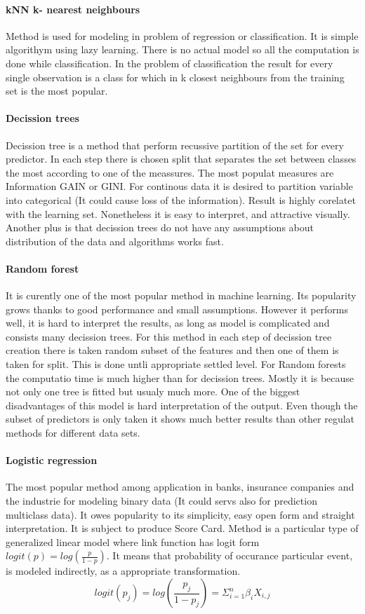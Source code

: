 \documentclass[10pt]{article}\usepackage[]{graphicx}\usepackage[]{color}
\begin{document}
\paragraph{kNN k- nearest neighbours}
Method is used for modeling in problem of regression or classification. 
It is simple algorithym using lazy learning. There is no actual model so all the 
computation is done while classification. 
In the problem of classification the result for every single observation is 
a class for which in k closest neighbours from the training set is the most
popular.
\paragraph{Decission trees}
Decission tree is a method that perform recussive partition of the set for every
predictor. In each step there is chosen split that separates the set between 
classes the most according to one of the meassures. The most populat measures 
are Information GAIN or GINI.
For continous data it is desired to partition variable into categorical 
(It could cause loss of the information). Result is highly corelatet with the 
learning set. Nonetheless it is easy to interpret, and attractive visually. 
Another plus is that decission trees do not have any assumptions about 
distribution of the data and algorithms works fast. 
\paragraph{Random forest}
It is curently one of the most popular method in machine learning. Its popularity 
grows thanks to good performance and small assumptions. 
However it performs well, it is hard to interpret the results, as long as model 
is complicated and consists many decission trees. 
For this method in each step of decission tree creation there is taken random 
subset of the features and then one of them is taken for split. This is done 
untli appropriate settled level. 
For Random forests the computatio time is much higher than for decission trees. 
Mostly it is because not only one tree is fitted but usualy much more. 
One of the biggest disadvantages of this model is hard interpretation of the 
output. 
Even though the subset of predictors is only taken it shows much better results
than other regulat methods for different data sets.
\paragraph{Logistic regression}
The most popular method among application in banks, insurance companies and the
industrie for modeling binary data (It could servs also for prediction 
multiclass data). It owes popularity to its simplicity, easy open form and
straight interpretation. It is subject to produce Score Card.
Method is a particular type of generalized linear model where link function has 
logit form $logit(p) = log(\frac{p}{1-p})$. It means that probability of 
occurance particular event, is modeled indirectly, as a appropriate 
transformation. 
$$ logit(p_j) = log(\frac{p_j}{1-p_j}) = \Sigma_{i=1}^{n}\beta_i X_{i,j} $$
  
\end{document}
